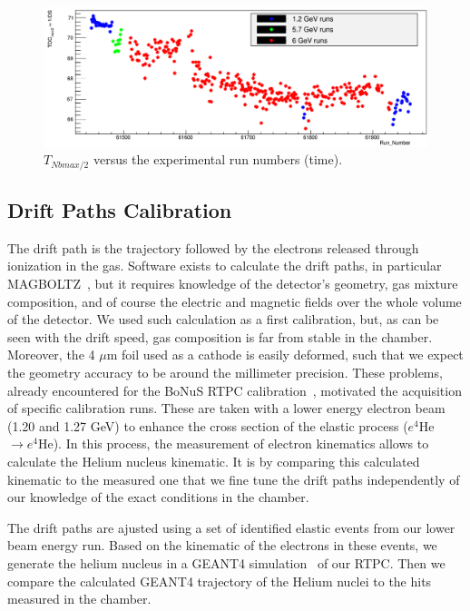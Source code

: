\documentclass[twocolumn,showpacs,superscriptaddress,groupedaddress]{revtex4}
\begin{document}
\begin{figure}[tb]
\hspace*{-1.8cm}
\includegraphics[scale=0.26]{fig/Drift_run_number_1.png}
\caption{$T_{Nbmax/2}$ versus the experimental run numbers (time).  } 
\label{fig:Drift_run_number_1}
\end{figure}

   
\subsection{Drift Paths Calibration}

The drift path is the trajectory followed by the electrons released through 
ionization in the gas. Software exists to calculate the drift paths, in particular
MAGBOLTZ~\cite{MAGBOLTZ}, but it requires knowledge of the detector's 
geometry, gas mixture composition, and of course the electric and magnetic 
fields over the whole volume of the detector. We used such calculation as a 
first calibration, but, 
as can be seen with the drift speed, gas composition is far from stable in the 
chamber. Moreover, the 4 $\mu$m foil used as a cathode is easily deformed, such
that we expect the geometry accuracy to be around the millimeter precision. 
These problems, already 
encountered for the BoNuS RTPC calibration~\cite{BONUS-NIM}, motivated the 
acquisition of specific calibration runs. These are taken with a lower energy 
electron beam (1.20 and 1.27 GeV) to enhance the cross section of the elastic 
process ($e^{4}$He$\rightarrow e^{4}$He). In this process, the measurement of
electron kinematics allows to calculate the Helium nucleus kinematic. It is
by comparing this calculated kinematic to the measured one that we fine tune
the drift paths independently of our knowledge of the exact conditions in the 
chamber.

The drift paths are ajusted using a set of identified elastic events 
from our lower beam energy run. Based on the kinematic of the electrons in
these events, we generate the helium nucleus in a GEANT4 
simulation~\cite{GEANT4} of our RTPC. Then we compare the calculated GEANT4 trajectory of 
the Helium nuclei to the hits measured in the chamber. 
\end{document}
